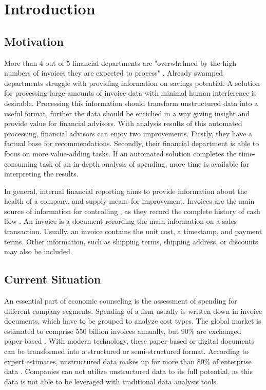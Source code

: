 \chapter{Introduction}
\section{Motivation}

More than 4 out of 5 financial departments are "overwhelmed by the high numbers of invoices they are expected to process"  \cite{manualInvoiceProcessing}. Already swamped departments struggle with providing information on savings potential. A solution for processing large amounts of invoice data with minimal human interference is desirable. Processing this information should transform unstructured data into a useful format, further the data should be enriched in a way giving insight and provide value for financial advisors. With analysis results of this automated processing, financial advisors can enjoy two improvements. Firstly, they have a factual base for recommendations. Secondly, their financial department is able to focus on more value-adding tasks. If an automated solution completes the time-consuming task of an in-depth analysis of spending, more time is available for interpreting the results.

In general, internal financial reporting aims to provide information about the health of a company, and supply means for improvement. Invoices are the main source of information for controlling \cite{investopediaInvoices}, as they record the complete history of cash flow \cite{invoicesPurpose}. An invoice is a document recording the main information on a sales transaction. Usually, an invoice contains the unit cost, a timestamp, and payment terms. Other information, such as shipping terms, shipping address, or discounts may also be included. 

\section{Current Situation}
An essential part of economic counseling is the assessment of spending for different company segments. Spending of a firm usually is written down in invoice documents, which have to be grouped  to analyze cost types.
The global market is estimated to comprise 550 billion invoices annually, but 90\% are exchanged paper-based \cite[p.~5]{kochEInvoicingJourney}. With modern technology, these paper-based or digital documents can be transformed into a structured or semi-structured format. According to expert estimates, unstructured data makes up for more than 80\% of enterprise data \cite{structuredAndUnstructuredData}. Companies can not utilize unstructured data to its full potential, as this data is not able to be leveraged with traditional data analysis tools.

